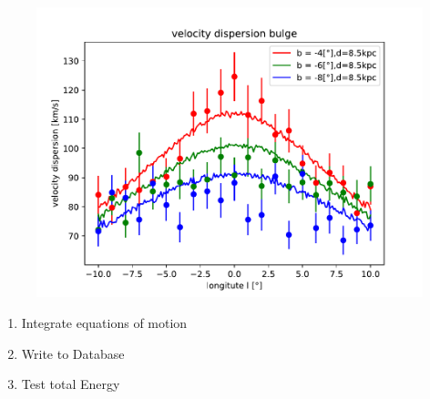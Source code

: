 \documentclass{beamer}
\begin{document}


\begin{frame}
\begin{figure}
\centering
\includegraphics[width=\textwidth,height=\textheight,keepaspectratio]{Images/velocity_dispersion_bulge.pdf}
\end{figure}
\end{frame}


\begin{frame}
\begin{enumerate}
\item<1-> Integrate equations of motion
\item<2-> Write to Database
\item<3-> Test total Energy
\end{enumerate}
\end{frame}
\end{document}
